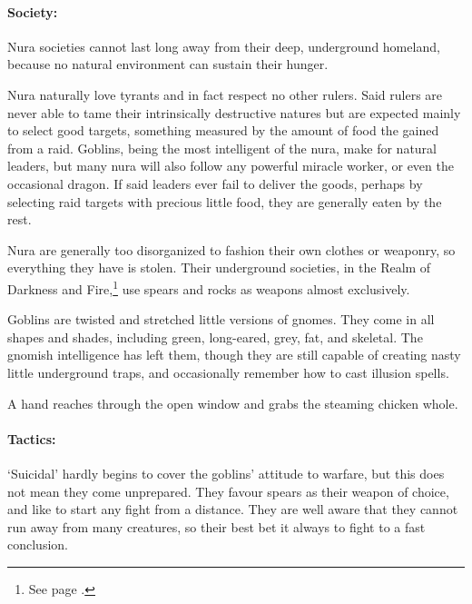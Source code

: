 \begin{multicols}{2}
\paragraph{Society:}
Nura societies cannot last long away from their deep, underground homeland, because no natural environment can sustain their hunger.

Nura naturally love tyrants and in fact respect no other rulers.
Said rulers are never able to tame their intrinsically destructive natures but are expected mainly to select good targets, something measured by the amount of food the gained from a raid.
Goblins, being the most intelligent of the nura, make for natural leaders, but many nura will also follow any powerful miracle worker, or even the occasional dragon.
If said leaders ever fail to deliver the goods, perhaps by selecting raid targets with precious little food, they are generally eaten by the rest.

Nura are generally too disorganized to fashion their own clothes or weaponry, so everything they have is stolen.
Their underground societies, in the Realm of Darkness and Fire,\footnote{See page \pageref{darknessandfire}.} use spears and rocks as weapons almost exclusively.

\label{goblin}

Goblins are twisted and stretched little versions of gnomes.
They come in all shapes and shades, including green, long-eared, grey, fat, and skeletal.
The gnomish intelligence has left them, though they are still capable of creating nasty little underground traps, and occasionally remember how to cast illusion spells.

\begin{boxtext}

	A hand reaches through the open window and grabs the steaming chicken whole.

\end{boxtext}

\paragraph{Tactics:} `Suicidal' hardly begins to cover the goblins' attitude to warfare, but this does not mean they come unprepared.
They favour spears as their weapon of choice, and like to start any fight from a distance.
They are well aware that they cannot run away from many creatures, so their best bet it always to fight to a fast conclusion.


\end{multicols}
